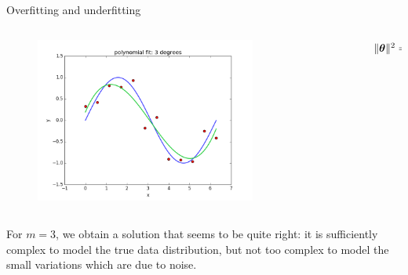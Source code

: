 \documentclass[xcolor=pdftex,dvipsnames,table,mathserif]{beamer}
\begin{document}
\begin{frame}{Overfitting and underfitting}
\begin{columns}
\begin{column}{.8\textwidth}
\begin{figure}[htb]
	\includegraphics[width=0.75\textwidth]{../graphics/polyfit_degree_3.png}
\end{figure}
\end{column}
\begin{column}{.2\textwidth}
$\| \boldsymbol{\theta} \|^2 = 1.72$
\end{column}
\end{columns}
For $m=3$, we obtain a solution that seems to be quite right: it is sufficiently complex to model the true data distribution, but not too complex to model the small variations which are due to noise.
\end{frame}
\end{document}
